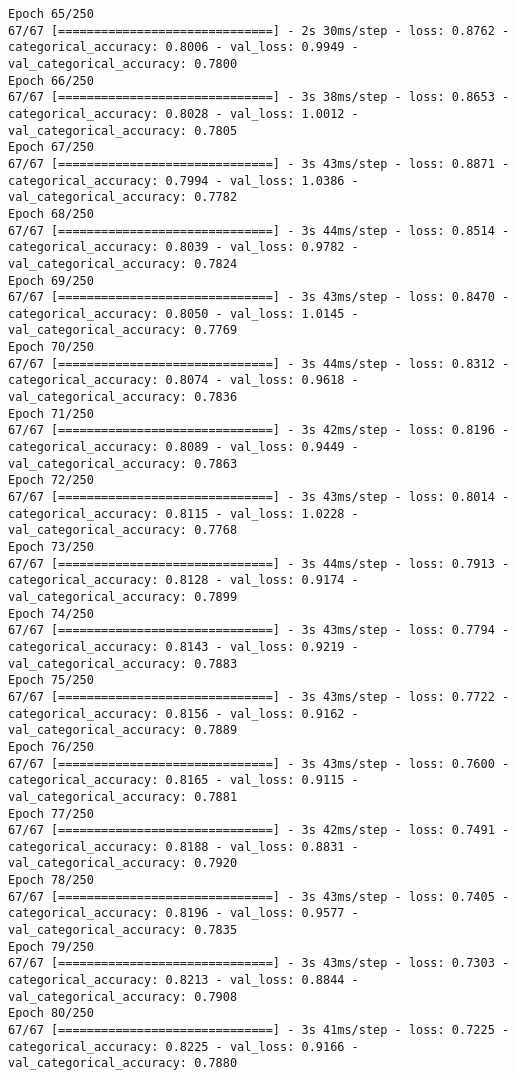 \begin{lstlisting}
Epoch 65/250
67/67 [==============================] - 2s 30ms/step - loss: 0.8762 - categorical_accuracy: 0.8006 - val_loss: 0.9949 - val_categorical_accuracy: 0.7800
Epoch 66/250
67/67 [==============================] - 3s 38ms/step - loss: 0.8653 - categorical_accuracy: 0.8028 - val_loss: 1.0012 - val_categorical_accuracy: 0.7805
Epoch 67/250
67/67 [==============================] - 3s 43ms/step - loss: 0.8871 - categorical_accuracy: 0.7994 - val_loss: 1.0386 - val_categorical_accuracy: 0.7782
Epoch 68/250
67/67 [==============================] - 3s 44ms/step - loss: 0.8514 - categorical_accuracy: 0.8039 - val_loss: 0.9782 - val_categorical_accuracy: 0.7824
Epoch 69/250
67/67 [==============================] - 3s 43ms/step - loss: 0.8470 - categorical_accuracy: 0.8050 - val_loss: 1.0145 - val_categorical_accuracy: 0.7769
Epoch 70/250
67/67 [==============================] - 3s 44ms/step - loss: 0.8312 - categorical_accuracy: 0.8074 - val_loss: 0.9618 - val_categorical_accuracy: 0.7836
Epoch 71/250
67/67 [==============================] - 3s 42ms/step - loss: 0.8196 - categorical_accuracy: 0.8089 - val_loss: 0.9449 - val_categorical_accuracy: 0.7863
Epoch 72/250
67/67 [==============================] - 3s 43ms/step - loss: 0.8014 - categorical_accuracy: 0.8115 - val_loss: 1.0228 - val_categorical_accuracy: 0.7768
Epoch 73/250
67/67 [==============================] - 3s 44ms/step - loss: 0.7913 - categorical_accuracy: 0.8128 - val_loss: 0.9174 - val_categorical_accuracy: 0.7899
Epoch 74/250
67/67 [==============================] - 3s 43ms/step - loss: 0.7794 - categorical_accuracy: 0.8143 - val_loss: 0.9219 - val_categorical_accuracy: 0.7883
Epoch 75/250
67/67 [==============================] - 3s 43ms/step - loss: 0.7722 - categorical_accuracy: 0.8156 - val_loss: 0.9162 - val_categorical_accuracy: 0.7889
Epoch 76/250
67/67 [==============================] - 3s 43ms/step - loss: 0.7600 - categorical_accuracy: 0.8165 - val_loss: 0.9115 - val_categorical_accuracy: 0.7881
Epoch 77/250
67/67 [==============================] - 3s 42ms/step - loss: 0.7491 - categorical_accuracy: 0.8188 - val_loss: 0.8831 - val_categorical_accuracy: 0.7920
Epoch 78/250
67/67 [==============================] - 3s 43ms/step - loss: 0.7405 - categorical_accuracy: 0.8196 - val_loss: 0.9577 - val_categorical_accuracy: 0.7835
Epoch 79/250
67/67 [==============================] - 3s 43ms/step - loss: 0.7303 - categorical_accuracy: 0.8213 - val_loss: 0.8844 - val_categorical_accuracy: 0.7908
Epoch 80/250
67/67 [==============================] - 3s 41ms/step - loss: 0.7225 - categorical_accuracy: 0.8225 - val_loss: 0.9166 - val_categorical_accuracy: 0.7880

\end{lstlisting}
